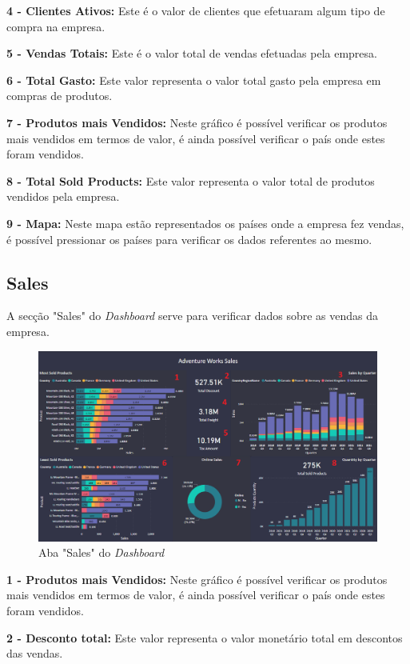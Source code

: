 \textbf{4 - Clientes Ativos:} Este é o valor de clientes que efetuaram algum tipo de compra na empresa.

\textbf{5 - Vendas Totais:} Este é o valor total de vendas efetuadas pela empresa.

\textbf{6 - Total Gasto:} Este valor representa o valor total gasto pela empresa em compras de produtos.

\textbf{7 - Produtos mais Vendidos:} Neste gráfico é possível verificar os produtos mais vendidos em termos de valor, é ainda possível verificar o país onde estes foram vendidos.

\textbf{8 - Total Sold Products:} Este valor representa o valor total de produtos vendidos pela empresa.

\textbf{9 - Mapa:} Neste mapa estão representados os países onde a empresa fez vendas, é possível pressionar os países para verificar os dados referentes ao mesmo.
 
\subsection{Sales}

A secção "Sales" do \textit{Dashboard} serve para verificar dados sobre as vendas da empresa.


\begin{figure}[H]
    \centering
    \includegraphics[scale=0.4]{images/Sales.png}
    \caption{Aba "Sales" do \textit{Dashboard}}
\end{figure}

\textbf{1 - Produtos mais Vendidos:} Neste gráfico é possível verificar os produtos mais vendidos em termos de valor, é ainda possível verificar o país onde estes foram vendidos.

\textbf{2 - Desconto total:} Este valor representa o valor monetário total em descontos das vendas.

